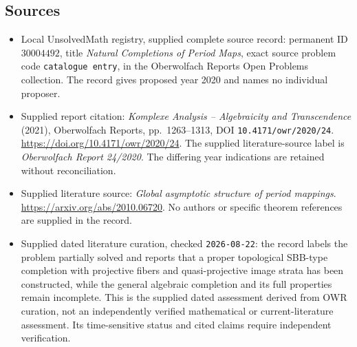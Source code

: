 \documentclass[11pt]{article}
\begin{document}
\subsection{Sources}
\begin{itemize}
\item Local UnsolvedMath registry, supplied complete source record: permanent ID \(30004492\), title \emph{Natural Completions of Period Maps}, exact source problem code \texttt{catalogue entry}, in the Oberwolfach Reports Open Problems collection. The record gives proposed year 2020 and names no individual proposer.
\item Supplied report citation: \emph{Komplexe Analysis -- Algebraicity and Transcendence} (2021), Oberwolfach Reports, pp.~1263--1313, DOI \texttt{10.4171/owr/2020/24}. \url{https://doi.org/10.4171/owr/2020/24}. The supplied literature-source label is \emph{Oberwolfach Report 24/2020}. The differing year indications are retained without reconciliation.
\item Supplied literature source: \emph{Global asymptotic structure of period mappings}. \url{https://arxiv.org/abs/2010.06720}. No authors or specific theorem references are supplied in the record.
\item Supplied dated literature curation, checked \texttt{2026-08-22}: the record labels the problem partially solved and reports that a proper topological SBB-type completion with projective fibers and quasi-projective image strata has been constructed, while the general algebraic completion and its full properties remain incomplete. This is the supplied dated assessment derived from OWR curation, not an independently verified mathematical or current-literature assessment. Its time-sensitive status and cited claims require independent verification.
\end{itemize}
\end{document}
